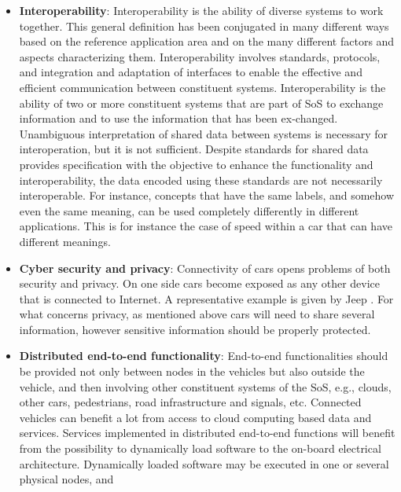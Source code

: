 \begin{itemize}
\item {\bf Interoperability}: Interoperability is the ability of diverse systems to work together. This general definition has been conjugated in many different ways based on the reference application area and on the many different factors and aspects characterizing them. Interoperability involves standards, protocols, and integration and adaptation of interfaces to enable the effective and efficient communication between constituent systems. Interoperability is the ability of two or more constituent systems that are part of SoS to exchange information and to use the information that has been ex-changed. Unambiguous interpretation of shared data between systems is necessary for interoperation, but it is not sufficient. Despite standards for shared data provides specification with the objective to enhance the functionality and interoperability, the data encoded using these standards are not necessarily interoperable. For instance, concepts that have the same labels, and somehow even the same meaning, can be used completely differently in different applications. This is for instance the case of speed within a car that can have different meanings.
\item {\bf Cyber security and privacy}:
Connectivity of cars opens problems of both security and privacy. On one side cars become exposed as any other device that is connected to Internet. A representative example is given by Jeep . For what concerns privacy, as mentioned above cars will need to share several information, however sensitive information should be properly protected.
\item {\bf Distributed end-to-end functionality}: End-to-end functionalities should be provided not only between nodes in the vehicles but also outside the vehicle, and then involving other constituent systems of the SoS, e.g., clouds, other cars, pedestrians, road infrastructure and signals, etc. Connected vehicles can benefit a lot from access to cloud computing based data and services. %
Services implemented in distributed end-to-end functions will benefit from the possibility to dynamically load software to the on-board electrical architecture. Dynamically loaded software may be executed in one or several physical nodes, and %

\end{itemize}
